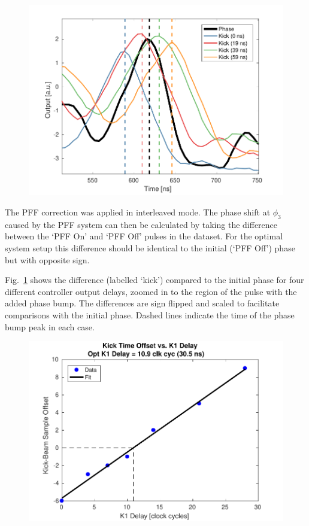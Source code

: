 \documentclass[%
 reprint,
 superscriptaddress,
 amsmath,
 amssymb,
 prstab,
]{revtex4-1}
\begin{document}
\begin{figure}
	\includegraphics[width=\columnwidth]{figs/comis/absDelay_zoom}%
	\caption{\label{f:absDelay_zoom}
	}
\end{figure}

The PFF correction was applied in interleaved mode. The phase shift at 
\(\phi_3\) caused by the PFF system can then be calculated by taking the 
difference between the `PFF On' and `PFF Off' pulses in the dataset. For the 
optimal system setup this difference should be identical to the initial (`PFF 
Off') phase but with opposite sign.

Fig.~\ref{f:absDelay_zoom} shows the difference (labelled `kick') compared to 
the initial phase for four different controller output delays, zoomed in to the 
region of the pulse with the added phase bump. The differences are sign flipped 
and scaled to facilitate comparisons with the initial phase. Dashed lines 
indicate the time of the phase bump peak in each case. 

\begin{figure}
	\includegraphics[width=\columnwidth]{figs/comis/OptDelayFit}%
	\caption{\label{f:OptDelayFit}
	}
\end{figure}
\end{document}
